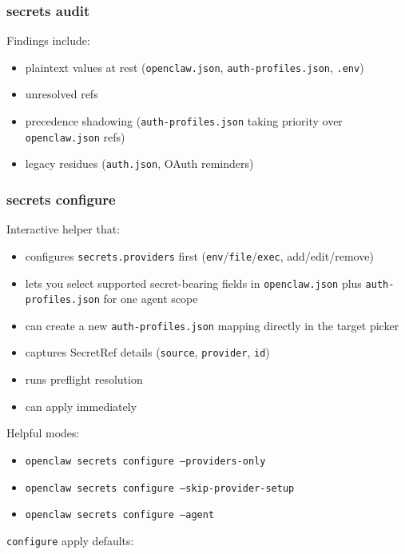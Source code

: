\subsubsection{secrets audit}


Findings include:

\begin{itemize}
  \item plaintext values at rest (\texttt{openclaw.json}, \texttt{auth-profiles.json}, \texttt{.env})
  \item unresolved refs
  \item precedence shadowing (\texttt{auth-profiles.json} taking priority over \texttt{openclaw.json} refs)
  \item legacy residues (\texttt{auth.json}, OAuth reminders)
\end{itemize}


\subsubsection{secrets configure}


Interactive helper that:

\begin{itemize}
  \item configures \texttt{secrets.providers} first (\texttt{env}/\texttt{file}/\texttt{exec}, add/edit/remove)
  \item lets you select supported secret-bearing fields in \texttt{openclaw.json} plus \texttt{auth-profiles.json} for one agent scope
  \item can create a new \texttt{auth-profiles.json} mapping directly in the target picker
  \item captures SecretRef details (\texttt{source}, \texttt{provider}, \texttt{id})
  \item runs preflight resolution
  \item can apply immediately
\end{itemize}


Helpful modes:

\begin{itemize}
  \item \texttt{openclaw secrets configure --providers-only}
  \item \texttt{openclaw secrets configure --skip-provider-setup}
  \item \texttt{openclaw secrets configure --agent }
\end{itemize}


\texttt{configure} apply defaults:

